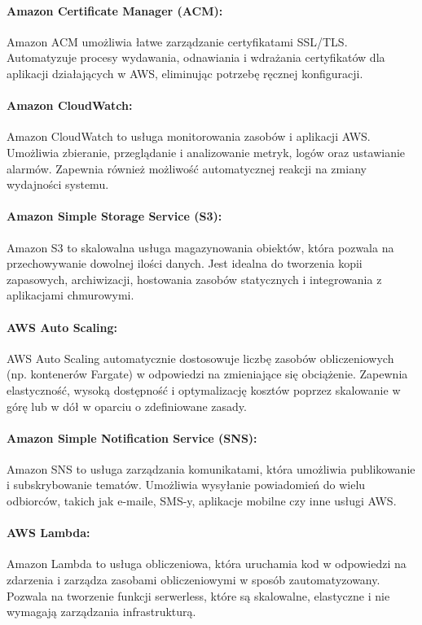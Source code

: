 \documentclass[../../main.tex]{subfiles}
\begin{document}
        \paragraph{Amazon Certificate Manager (ACM):}
        Amazon ACM umożliwia łatwe zarządzanie certyfikatami SSL/TLS. Automatyzuje procesy wydawania, odnawiania i wdrażania certyfikatów dla aplikacji działających w AWS, eliminując potrzebę ręcznej konfiguracji.

        \paragraph{Amazon CloudWatch:}
        Amazon CloudWatch to usługa monitorowania zasobów i aplikacji AWS. Umożliwia zbieranie, przeglądanie i analizowanie metryk, logów oraz ustawianie alarmów. Zapewnia również możliwość automatycznej reakcji na zmiany wydajności systemu.

        \paragraph{Amazon Simple Storage Service (S3):}
        Amazon S3 to skalowalna usługa magazynowania obiektów, która pozwala na przechowywanie dowolnej ilości danych. Jest idealna do tworzenia kopii zapasowych, archiwizacji, hostowania zasobów statycznych i integrowania z aplikacjami chmurowymi.

        \paragraph{AWS Auto Scaling:}
        AWS Auto Scaling automatycznie dostosowuje liczbę zasobów obliczeniowych (np. kontenerów Fargate) w odpowiedzi na zmieniające się obciążenie. Zapewnia elastyczność, wysoką dostępność i optymalizację kosztów poprzez skalowanie w górę lub w dół w oparciu o zdefiniowane zasady.

        \paragraph{Amazon Simple Notification Service (SNS):}
        Amazon SNS to usługa zarządzania komunikatami, która umożliwia publikowanie i subskrybowanie tematów. Umożliwia wysyłanie powiadomień do wielu odbiorców, takich jak e-maile, SMS-y, aplikacje mobilne czy inne usługi AWS.

        \paragraph{AWS Lambda:}
        Amazon Lambda to usługa obliczeniowa, która uruchamia kod w odpowiedzi na zdarzenia i zarządza zasobami obliczeniowymi w sposób zautomatyzowany. Pozwala na tworzenie funkcji serwerless, które są skalowalne, elastyczne i nie wymagają zarządzania infrastrukturą.
\end{document}
